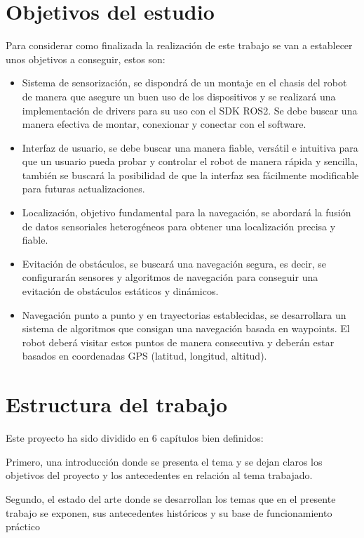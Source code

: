 \section{Objetivos del estudio}
Para considerar como finalizada la realización de este trabajo se van a establecer unos objetivos a conseguir, estos son:
\begin{itemize}
  \item Sistema de sensorización, se dispondrá de un montaje en el chasis del robot de manera que asegure un buen uso de los dispositivos y 
se realizará una implementación de drivers para su uso con el SDK ROS2. Se debe buscar una manera efectiva de montar, conexionar y conectar 
con el software. 
  \item Interfaz de usuario, se debe buscar una manera fiable, versátil e intuitiva para que un usuario pueda probar y controlar el robot de 
manera rápida y sencilla, también se buscará la posibilidad de que la interfaz sea fácilmente modificable para futuras actualizaciones.
  \item Localización, objetivo fundamental para la navegación, se abordará la fusión de datos sensoriales heterogéneos para obtener una 
localización precisa y fiable.
  \item Evitación de obstáculos, se buscará una navegación segura, es decir, se configurarán sensores y algoritmos de navegación para 
conseguir una evitación de obstáculos estáticos y dinámicos.
  \item Navegación punto a punto y en trayectorias establecidas, se desarrollara un sistema de algoritmos que consigan una navegación 
basada en waypoints. El robot deberá visitar estos puntos de manera consecutiva  y deberán estar basados en coordenadas GPS (latitud, 
longitud, altitud).
\end{itemize}

\section{Estructura del trabajo}

Este proyecto ha sido dividido en 6 capítulos bien definidos:

Primero, una introducción donde se presenta el tema y se dejan claros los objetivos del proyecto y los antecedentes en relación al tema trabajado.

Segundo, el estado del arte donde se desarrollan los temas que en el presente trabajo se exponen, sus antecedentes históricos y su base de 
funcionamiento práctico

